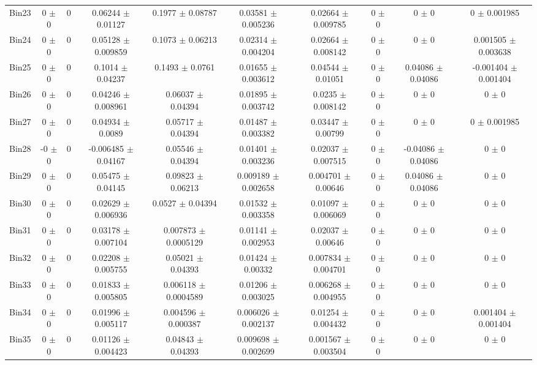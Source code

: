 \begin{tabular}{@{\extracolsep{4pt}}lccccccccc@{}}
     Bin23 & 0 $\pm$ 0 & 0 & 0.06244 $\pm$ 0.01127 & 0.1977 $\pm$ 0.08787 & 0.03581 $\pm$ 0.005236 & 0.02664 $\pm$ 0.009785 & 0 $\pm$ 0 & 0 $\pm$ 0 & 0 $\pm$ 0.001985 \\ 
     Bin24 & 0 $\pm$ 0 & 0 & 0.05128 $\pm$ 0.009859 & 0.1073 $\pm$ 0.06213 & 0.02314 $\pm$ 0.004204 & 0.02664 $\pm$ 0.008142 & 0 $\pm$ 0 & 0 $\pm$ 0 & 0.001505 $\pm$ 0.003638 \\ 
     Bin25 & 0 $\pm$ 0 & 0 & 0.1014 $\pm$ 0.04237 & 0.1493 $\pm$ 0.0761 & 0.01655 $\pm$ 0.003612 & 0.04544 $\pm$ 0.01051 & 0 $\pm$ 0 & 0.04086 $\pm$ 0.04086 & -0.001404 $\pm$ 0.001404 \\ 
     Bin26 & 0 $\pm$ 0 & 0 & 0.04246 $\pm$ 0.008961 & 0.06037 $\pm$ 0.04394 & 0.01895 $\pm$ 0.003742 & 0.0235 $\pm$ 0.008142 & 0 $\pm$ 0 & 0 $\pm$ 0 & 0 $\pm$ 0 \\ 
     Bin27 & 0 $\pm$ 0 & 0 & 0.04934 $\pm$ 0.0089 & 0.05717 $\pm$ 0.04394 & 0.01487 $\pm$ 0.003382 & 0.03447 $\pm$ 0.00799 & 0 $\pm$ 0 & 0 $\pm$ 0 & 0 $\pm$ 0.001985 \\ 
     Bin28 & -0 $\pm$ 0 & 0 & -0.006485 $\pm$ 0.04167 & 0.05546 $\pm$ 0.04394 & 0.01401 $\pm$ 0.003236 & 0.02037 $\pm$ 0.007515 & 0 $\pm$ 0 & -0.04086 $\pm$ 0.04086 & 0 $\pm$ 0 \\ 
     Bin29 & 0 $\pm$ 0 & 0 & 0.05475 $\pm$ 0.04145 & 0.09823 $\pm$ 0.06213 & 0.009189 $\pm$ 0.002658 & 0.004701 $\pm$ 0.00646 & 0 $\pm$ 0 & 0.04086 $\pm$ 0.04086 & 0 $\pm$ 0 \\ 
     Bin30 & 0 $\pm$ 0 & 0 & 0.02629 $\pm$ 0.006936 & 0.0527 $\pm$ 0.04394 & 0.01532 $\pm$ 0.003358 & 0.01097 $\pm$ 0.006069 & 0 $\pm$ 0 & 0 $\pm$ 0 & 0 $\pm$ 0 \\ 
     Bin31 & 0 $\pm$ 0 & 0 & 0.03178 $\pm$ 0.007104 & 0.007873 $\pm$ 0.0005129 & 0.01141 $\pm$ 0.002953 & 0.02037 $\pm$ 0.00646 & 0 $\pm$ 0 & 0 $\pm$ 0 & 0 $\pm$ 0 \\ 
     Bin32 & 0 $\pm$ 0 & 0 & 0.02208 $\pm$ 0.005755 & 0.05021 $\pm$ 0.04393 & 0.01424 $\pm$ 0.00332 & 0.007834 $\pm$ 0.004701 & 0 $\pm$ 0 & 0 $\pm$ 0 & 0 $\pm$ 0 \\ 
     Bin33 & 0 $\pm$ 0 & 0 & 0.01833 $\pm$ 0.005805 & 0.006118 $\pm$ 0.0004589 & 0.01206 $\pm$ 0.003025 & 0.006268 $\pm$ 0.004955 & 0 $\pm$ 0 & 0 $\pm$ 0 & 0 $\pm$ 0 \\ 
     Bin34 & 0 $\pm$ 0 & 0 & 0.01996 $\pm$ 0.005117 & 0.004596 $\pm$ 0.000387 & 0.006026 $\pm$ 0.002137 & 0.01254 $\pm$ 0.004432 & 0 $\pm$ 0 & 0 $\pm$ 0 & 0.001404 $\pm$ 0.001404 \\ 
     Bin35 & 0 $\pm$ 0 & 0 & 0.01126 $\pm$ 0.004423 & 0.04843 $\pm$ 0.04393 & 0.009698 $\pm$ 0.002699 & 0.001567 $\pm$ 0.003504 & 0 $\pm$ 0 & 0 $\pm$ 0 & 0 $\pm$ 0 \\ 

\end{tabular}
